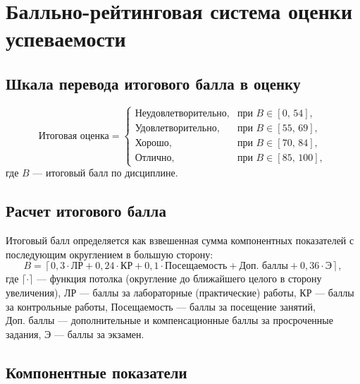 \documentclass[10pt,a4paper]{article}
\begin{document}
    \section{Балльно-рейтинговая система оценки успеваемости}

    \subsection{Шкала перевода итогового балла в оценку}
    \begin{equation}
        \text{Итоговая оценка} =
        \begin{cases}
            \text{Неудовлетворительно}, & \text{при } B \in [0,\,54], \\
            \text{Удовлетворительно},   & \text{при } B \in [55,\,69], \\
            \text{Хорошо},              & \text{при } B \in [70,\,84], \\
            \text{Отлично},             & \text{при } B \in [85,\,100],
        \end{cases}
    \end{equation}
    где $B$ --- итоговый балл по дисциплине.

    \subsection{Расчет итогового балла}
    Итоговый балл определяется как взвешенная сумма компонентных показателей с последующим округлением в большую сторону:
    \begin{equation}
        B =
        \left\lceil
        0,3 \cdot \text{ЛР} +
        0,24 \cdot \text{КР} +
        0,1 \cdot \text{Посещаемость} +
        \text{Доп. баллы} +
        0,36 \cdot \text{Э}
        \right\rceil,
    \end{equation}
    где $\lceil \cdot \rceil$ --- функция потолка (округление до ближайшего целого в сторону увеличения),
    $ \text{ЛР} $ --- баллы за лабораторные (практические) работы,
    $ \text{КР} $ --- баллы за контрольные работы,
    $ \text{Посещаемость} $ --- баллы за посещение занятий,
    $ \text{Доп. баллы} $ --- дополнительные и компенсационные баллы за просроченные задания,
    $ \text{Э}$ --- баллы за экзамен.

    \subsection{Компонентные показатели}
\end{document}
